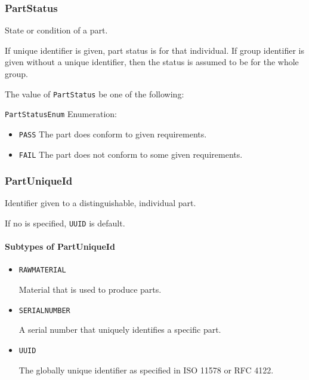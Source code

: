\subsubsection{PartStatus}
\label{sec:PartStatus}



State or condition of a part.

If unique identifier is given, part status is for that individual. If group identifier is given without a unique identifier, then the status is assumed to be for the whole group.


The value of \texttt{PartStatus} \MUST be one of the following: 


\texttt{PartStatusEnum} Enumeration:

\begin{itemize}
\item \texttt{PASS} \newline The part does conform to given requirements. 
\item \texttt{FAIL} \newline The part does not conform to some given requirements. 
\end{itemize}



\subsubsection{PartUniqueId}
\label{sec:PartUniqueId}



Identifier given to a distinguishable, individual part. 

If no  is specified, \texttt{UUID} is default.



\paragraph{Subtypes of PartUniqueId}\mbox{}
\label{sec:Subtypes of PartUniqueId}

\begin{itemize}

\item \texttt{RAW\textunderscore MATERIAL}


Material that is used to produce parts.

\item \texttt{SERIAL\textunderscore NUMBER}


A serial number that uniquely identifies a specific part.

\item \texttt{UUID}


The globally unique identifier as specified in ISO 11578 or RFC 4122.


\end{itemize}






